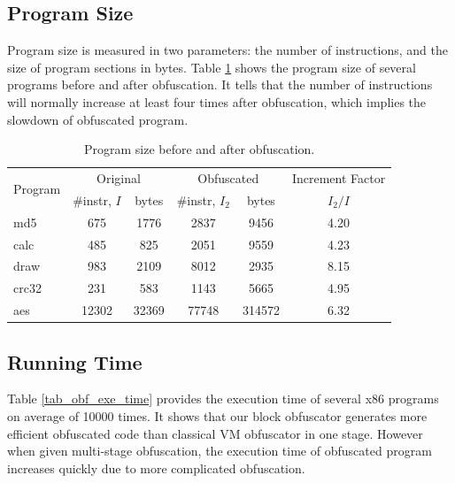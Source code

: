\documentclass{../style/llncs}                   %
\begin{document}
\subsection{Program Size}

Program size is measured in two parameters: the number of instructions,
and the size of program sections in bytes.
Table \ref{tab_obf_program_size} shows the program size of several programs before and after obfuscation.
It tells that the number of instructions will normally increase at least four
times after obfuscation, which implies the slowdown of obfuscated program.

\begin{table}  \centering
\caption{Program size before and after obfuscation. } \label{tab_obf_program_size}
\small %
\begin{tabular}{ |l|c|c|c|c|c| }
\hline
\multirow{2}{*}{Program} & \multicolumn{2}{|c|}{Original} & \multicolumn{2}{|c|}{Obfuscated} & Increment Factor \\
\cline{2-6}     & \#instr, $I$ & bytes & \#instr, $I_2$   & bytes  & $I_2/I$\\
\hline \hline
 md5     & 675   & 1776    &   2837    & 9456   & 4.20 \\
 calc    & 485   & 825     &   2051    & 9559   & 4.23 \\
 draw    & 983   & 2109    &   8012    & 2935   & 8.15 \\
 crc32   & 231   & 583     &   1143    & 5665   & 4.95 \\
 aes     & 12302 & 32369   &   77748   & 314572 & 6.32 \\
\hline
\end{tabular}
\end{table}


\subsection{Running Time}

Table \ref{tab_obf_exe_time} provides the execution time of several x86 programs
on average of 10000 times.
It shows that our block obfuscator generates more efficient obfuscated code
than classical VM obfuscator in one stage. However when given multi-stage obfuscation,
the execution time of obfuscated program increases quickly due to more
complicated obfuscation.
\end{document}
